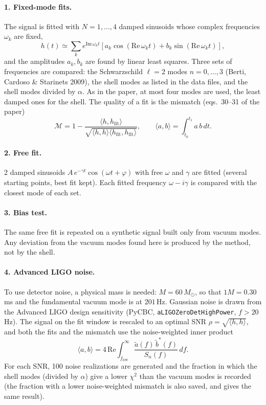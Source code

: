 \documentclass[11pt,a4paper]{article}
\begin{document}
\paragraph{1. Fixed-mode fits.} The signal is fitted with $N=1,\dots,4$ damped sinusoids
whose complex frequencies $\omega_k$ are fixed,
\begin{equation}
h(t)\simeq\sum_k e^{\mathrm{Im}\,\omega_k t}\left[a_k\cos(\mathrm{Re}\,\omega_k t)+b_k\sin(\mathrm{Re}\,\omega_k t)\right],
\end{equation}
and the amplitudes $a_k,b_k$ are found by linear least squares. Three sets of frequencies are compared:
the Schwarzschild $\ell=2$ modes $n=0,\dots,3$ (Berti, Cardoso \& Starinets 2009), the shell modes as listed in
the data files, and the shell modes divided by $\alpha$. As in the paper, at most four modes are used, the
least damped ones for the shell. The quality of a fit is the mismatch (eqs.~30--31 of the paper)
\begin{equation}
\mathcal{M}=1-\frac{\langle h,h_\mathrm{fit}\rangle}{\sqrt{\langle h,h\rangle\langle h_\mathrm{fit},h_\mathrm{fit}\rangle}},
\qquad \langle a,b\rangle=\int_{t_0}^{t_1}a\,b\,dt .
\end{equation}

\paragraph{2. Free fit.} 2 damped sinusoids $A\,e^{-\gamma t}\cos(\omega t+\varphi)$ with
free $\omega$ and $\gamma$ are fitted (several starting points, best fit kept). Each fitted frequency
$\omega-i\gamma$ is compared with the closest mode of each set.

\paragraph{3. Bias test.} The same free fit is repeated on a synthetic signal built only from vacuum modes.
Any deviation from the vacuum modes found here is produced by the method, not by the shell.

\paragraph{4. Advanced LIGO noise.} To use detector noise, a physical mass is needed: $M=60\,M_\odot$, so that $1M=0.30$\,ms and the fundamental vacuum
mode is at $201$\,Hz. Gaussian noise is drawn from the Advanced LIGO
design sensitivity (PyCBC, \texttt{aLIGOZeroDetHighPower}, $f>20$\,Hz). The signal on the
fit window is rescaled to an optimal SNR $\rho=\sqrt{\langle h,h\rangle}$, and both the fits and the mismatch
use the noise-weighted inner product
\begin{equation}
\langle a,b\rangle=4\,\mathrm{Re}\int_{f_\mathrm{low}}^{\infty}\frac{\tilde a(f)\,\tilde b^*(f)}{S_n(f)}\,df .
\end{equation}
For each SNR, 100 noise realizations are generated and the fraction in which the shell
modes (divided by $\alpha$) give a lower $\chi^2$ than the vacuum modes is recorded (the fraction with a lower
noise-weighted mismatch is also saved, and gives the same result).
\end{document}
